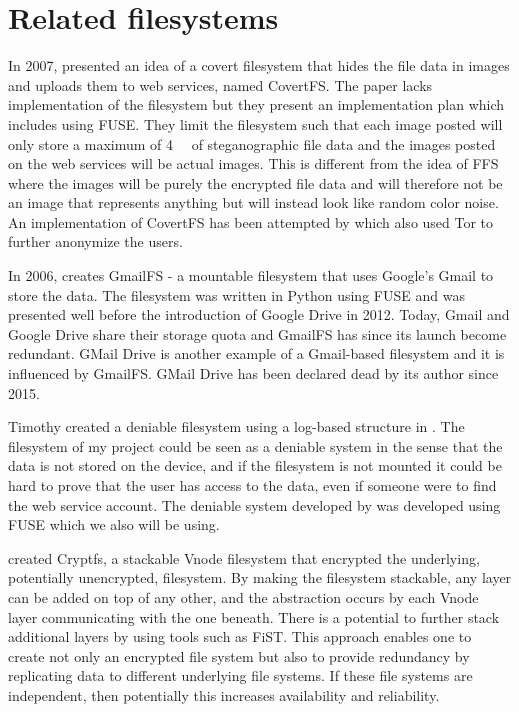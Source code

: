 \section{Related filesystems}
In 2007, \citeauthor{baliga2007web} presented an idea of a covert filesystem that hides the file data in images and uploads them to web services, named CovertFS\cite{baliga2007web}. The paper lacks implementation of the filesystem but they present an implementation plan which includes using FUSE. They limit the filesystem such that each image posted will only store a maximum of \SI{4}{\kilo\byte} of steganographic file data and the images posted on the web services will be actual images. This is different from the idea of FFS where the images will be purely the encrypted file data and will therefore not be an image that represents anything but will instead look like random color noise. An implementation of CovertFS has been attempted by \citeauthor{sosaSuperSecretFile2007} which also used Tor to further anonymize the users\cite{sosaSuperSecretFile2007}.

In 2006, \citeauthor{jonesGoogleHackUse2006} creates GmailFS - a mountable filesystem that uses Google's Gmail to store the data\cite{jonesGoogleHackUse2006}\cite{jonesGmailFilesystemImplementation2006}. The filesystem was written in Python using FUSE and was presented well before the introduction of Google Drive in 2012. Today, Gmail and Google Drive share their storage quota and GmailFS has since its launch become redundant. GMail Drive is another example of a Gmail-based filesystem and it is influenced by GmailFS\cite{viksoeViksoeDkGMail2004}. GMail Drive has been declared dead by its author since 2015.

Timothy \citeauthor{petersDEFYDeniableFile2014} created a deniable filesystem using a log-based structure in \citeyear{petersDEFYDeniableFile2014}\cite{petersDEFYDeniableFile2014}. The filesystem of my project could be seen as a deniable system in the sense that the data is not stored on the device, and if the filesystem is not mounted it could be hard to prove that the user has access to the data, even if someone were to find the web service account. The deniable system developed by \citeauthor{petersDEFYDeniableFile2014} was developed using FUSE\cite{Libfuse2021} which we also will be using.

\citeauthor{badulescuCryptfsStackableVnode1998} created Cryptfs, a stackable Vnode filesystem that encrypted the underlying, potentially unencrypted, filesystem\cite{badulescuCryptfsStackableVnode1998}. By making the filesystem stackable, any layer can be added on top of any other, and the abstraction occurs by each Vnode layer communicating with the one beneath. There is a potential to further stack additional layers by using tools such as FiST\cite{FiSTStackableFile}. This approach enables one to create not only an encrypted file system but also to provide redundancy by replicating data to different
underlying file systems. If these file systems are independent, then potentially this increases availability and reliability.